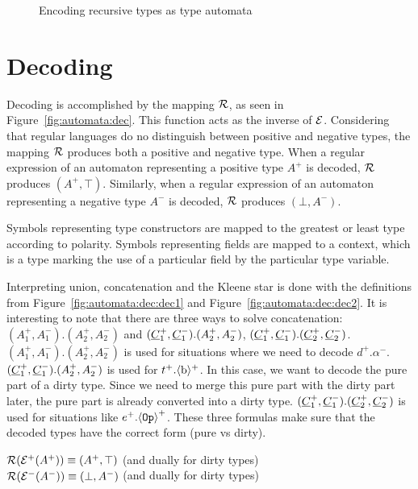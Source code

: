 \begin{figure}[!htb]
\begin{center}
\begin{framed}
\begin{minipage}[t]{0.475\columnwidth}
\begin{mathpar}
    \end{mathpar}
    \end{minipage}

    \end{framed}
    \end{center}
\caption{Encoding recursive types as type automata}\label{fig:automata:enc:rec}
\end{figure}

\section{Decoding}
Decoding is accomplished by the mapping $\dectype$, as seen in Figure~\ref{fig:automata:dec}. This function acts as the inverse of $\enctype$. Considering that regular languages do no distinguish between positive and negative types, the mapping $\dectype$ produces both a positive and negative type. When a regular expression of an automaton representing a positive type $A^+$ is decoded, $\dectype$ produces $(A^+, \top)$. Similarly, when a regular expression of an automaton representing a negative type $A^-$ is decoded, $\dectype$ produces $(\bot, A^-)$.

Symbols representing type constructors are mapped to the greatest or least type according to polarity. Symbols representing fields are mapped to a context, which is a type marking the use of a particular field by the particular type variable.

Interpreting union, concatenation and the Kleene star is done with the definitions from Figure~\ref{fig:automata:dec:dec1} and Figure~\ref{fig:automata:dec:dec2}. It is interesting to note that there are three ways to solve concatenation: $(A_1^+, A_1^-) . (A_2^+, A_2^-)$ and $(\C_1^+, \C_1^-) . (A_2^+, A_2^-)$, $(\C_1^+, \C_1^-) . (\C_2^+, \C_2^-)$. $(A_1^+, A_1^-) . (A_2^+, A_2^-)$ is used for situations where we need to decode $d^+ . \alpha^-$. $(\C_1^+, \C_1^-) . (A_2^+, A_2^-)$ is used for $t^+ . \booltp^+$. In this case, we want to decode the pure part of a dirty type. Since we need to merge this pure part with the dirty part later, the pure part is already converted into a dirty type. $(\C_1^+, \C_1^-) . (\C_2^+, \C_2^-)$ is used for situations like $e^+ . \optp{\op}^+$. These three formulas make sure that the decoded types have the correct form (pure vs dirty).

\begin{theorem}
\label{thm:equiv:dec}
$\dectype(\enctype^+(A^+)) \equiv (A^+, \top)$ (and dually for dirty types) \\
$\dectype(\enctype^-(A^-)) \equiv (\bot, A^-)$ (and dually for dirty types)
\end{theorem}


